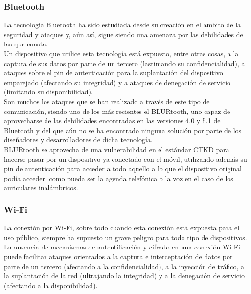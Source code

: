 \documentclass[11pt]{article}
\begin{document}
\subsubsection{Bluetooth}

{La tecnología Bluetooth ha sido estudiada desde su creación en el ámbito de la seguridad y ataques y, aún así, sigue siendo una amenaza por las debilidades de las que consta.} \\

{Un dispositivo que utilice esta tecnología está expuesto, entre otras cosas, a la captura de sus datos por parte de un tercero (lastimando su confidencialidad), a ataques sobre el pin de autenticación para la suplantación del dispositivo emparejado (afectando su integridad) y a ataques de denegación de servicio (limitando su disponibilidad).} \\

{Son muchos los ataques que se han realizado a través de este tipo de comunicación, siendo uno de los más recientes el BLURtooth, uno capaz de aprovecharse de las debilidades encontradas en las versiones 4.0 y 5.1 de Bluetooth y del que aún no se ha encontrado ninguna solución por parte de los diseñadores y desarrolladores de dicha tecnología.} \\

{BLURtooth se aprovecha de una vulnerabilidad en el estándar CTKD para hacerse pasar por un dispositivo ya conectado con el móvil, utilizando además su pin de autenticación para acceder a todo aquello a lo que el dispositivo original podía acceder, como pueda ser la agenda telefónica o la voz en el caso de los auriculares inalámbricos.}

\subsubsection{Wi-Fi}

{La conexión por Wi-Fi, sobre todo cuando esta conexión está expuesta para el uso público, siempre ha supuesto un grave peligro para todo tipo de dispositivos.} \\

{La ausencia de mecanismos de autentificación y cifrado en una conexión Wi-Fi puede facilitar ataques orientados a la captura e interceptación de datos por parte de un tercero (afectando a la confidencialidad), a la inyección de tráfico, a la suplantación de la red (ultrajando la integridad) y a la denegación de servicio (afectando a la disponibilidad).} \\
\end{document}
